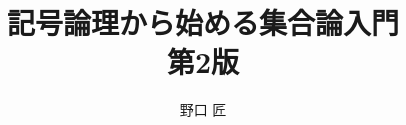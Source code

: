 \documentclass[a5j,11pt,uplatex,dvipdfmx,ja=standard]{bxjsbook}
\theoremstyle{mystyle} %
\renewcommand{\thesection}{{\S}{\,}\arabic{chapter}.\arabic{section}}
\renewcommand{\thefigure}{\arabic{chapter}.\arabic{figure}}
\renewcommand{\thetable}{\arabic{chapter}.\arabic{table}}
\renewcommand{\theequation}
  {\arabic{chapter}.\arabic{section}.\arabic{equation}}
\begin{document}
%
%
%
  \begin{titlepage} %
   \title{記号論理から始める集合論入門  \\ 第2版}
   \author{野口 匠}
   \date{}
 \maketitle
 \thispagestyle{empty}
 \end{titlepage}
%
%
\frontmatter %
 \tableofcontents %
%
%
 \setcounter{chapter}{-1}
\mainmatter %
%
%
%
%
\appendix %
%
\makeatletter
 \renewcommand{\theequation}
  {\Alph{chapter}.\arabic{section}.\arabic{equation}}
\makeatother
 \renewcommand{\thesection}{\S \  \Alph{chapter}.\arabic{section}}
 \renewcommand{\thefigure}{\Alph{chapter}.\arabic{section}.\arabic{figure}} %
 \renewcommand{\thetable}{\Alph{chapter}.\arabic{section}.\arabic{table}} %
%
%
%
%
%
%
\backmatter
{\small
     }
%
{\footnotesize
\printindex[nidx] %
\printindex[widx] %
}
%
%
\end{document}
